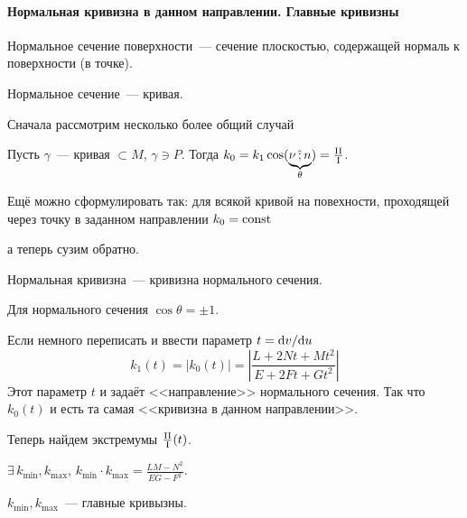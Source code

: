 \documentclass[draft,timbord]{longnotes}
\begin{document}
\paragraph{Нормальная кривизна в данном направлении. Главные кривизны}
\label{par:meas::curfctr}

\begin{defn}\label{defn:meas::curfctr::normsec}
  Нормальное сечение поверхности~--- сечение плоскостью, 
  содержащей нормаль к поверхности (в точке).
\end{defn}

\begin{lem}\label{lem:meas::curfctr::normsec}
  Нормальное сечение~--- кривая.
\end{lem}

Сначала рассмотрим несколько более общий случай

\begin{thrm}[Менье]\label{thrm:meas::curfctr::menie}
  Пусть $\gamma$~--- кривая $ \subset M$, $ \gamma \ni P$.
  Тогда $k_0 = k_1 \cos (\underbrace{\nu \,\text{\^;}\, n}_\theta) = \frac{\rm II}{\rm I} $.
\end{thrm}

\begin{rem}\label{rem:meas::curfctr::menie::ref}
  Ещё можно сформулировать так: для всякой кривой на повехности, проходящей через точку 
  в заданном направлении $k_0 = \rm const$
\end{rem}

а теперь сузим обратно.
\begin{defn}\label{defn:meas::curfctr::normcrvf}
  Нормальная кривизна~--- кривизна нормального сечения.
\end{defn}

Для нормального сечения $\cos\theta = \pm 1$.

Если немного переписать и ввести параметр $t= \mathrm{d} v /\mathrm{d} u $
\[
  k_1(t) = |k_0(t)| = \left|\frac{L + 2Nt + Mt^2}{E + 2Ft +Gt^2} \right|
\]
Этот параметр $t$ и задаёт <<направление>> нормального сечения. 
Так что $k_0(t)$ и есть та самая <<кривизна в данном направлении>>.

Теперь найдем экстремумы $\frac{\rm II}{\rm I} (t)$. 
\begin{thrm}\label{thrm:meas::curfctr::minmax}
  $\exists\, k_{\min}, k_{\max}$, $k_{\min} \cdot k_{\max} = \frac{LM - N^2}{EG - F^2}$.
\end{thrm}

\begin{defn}\label{defn:meas::curfctr::main}
  $k_{\min}, k_{\max}$~--- главные кривызны.
\end{defn}
\end{document}
